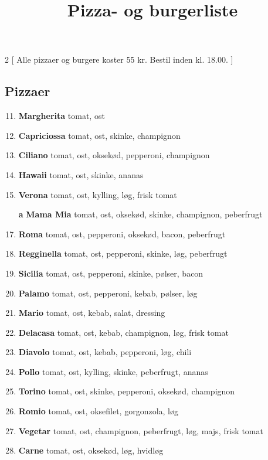 \documentclass[danish,a4paper]{article}
\title{Pizza- og burgerliste}
\date{}
\author{}
\begin{document}

\maketitle

\begin{multicols}{2}
[
\noindent Alle pizzaer og burgere koster 55 kr. Bestil inden kl. 18.00.
]
\subsection*{Pizzaer}
\begin{enumerate}[label={\large\textbf{\arabic*}.}]
    \setcounter{enumi}{10}
    \item \textbf{Margherita} tomat, ost
    \item \textbf{Capriciossa} tomat, ost, skinke, champignon
    \item \textbf{Ciliano} tomat, ost, oksekød, pepperoni, champignon
    \item \textbf{Hawaii} tomat, ost, skinke, ananas
    \item \textbf{Verona} tomat, ost, kylling, løg, frisk tomat
    \setcounter{enumi}{14}
    \item[{\large\textbf{\refstepcounter{enumi}\number\value{enumi}a}}] \textbf{Mama Mia} tomat, ost, oksekød, skinke, champignon, peberfrugt
    \item \textbf{Roma} tomat, ost, pepperoni, oksekød, bacon, peberfrugt
    \item \textbf{Regginella} tomat, ost, pepperoni, skinke, løg, peberfrugt
    \item \textbf{Sicilia} tomat, ost, pepperoni, skinke, pølser, bacon
    \item \textbf{Palamo} tomat, ost, pepperoni, kebab, pølser, løg
    \item \textbf{Mario} tomat, ost, kebab, salat, dressing
    \item \textbf{Delacasa} tomat, ost, kebab, champignon, løg, frisk tomat
    \item \textbf{Diavolo} tomat, ost, kebab, pepperoni, løg, chili
    \item \textbf{Pollo} tomat, ost, kylling, skinke, peberfrugt, ananas
    \item \textbf{Torino} tomat, ost, skinke, pepperoni, oksekød, champignon
    \item \textbf{Romio} tomat, ost, oksefilet, gorgonzola, løg
    \item \textbf{Vegetar} tomat, ost, champignon, peberfrugt, løg, majs, frisk tomat
    \item \textbf{Carne} tomat, ost, oksekød, løg, hvidløg
\end{enumerate}

\end{multicols}
\end{document}

